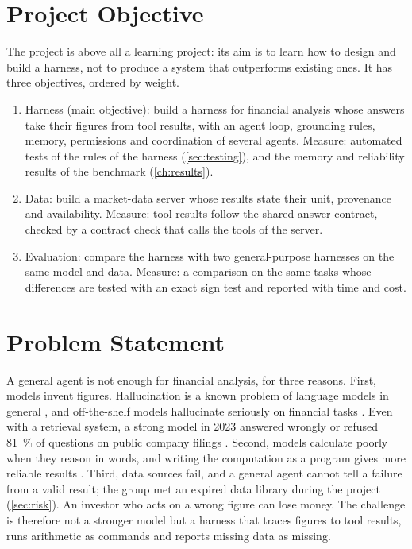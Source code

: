 \section{Project Objective}\label{sec:objective}
The project is above all a learning project: its aim is to learn how to design and build a harness, not to produce a system that outperforms existing ones.
It has three objectives, ordered by weight.
\begin{enumerate}
  \item Harness (main objective): build a harness for financial analysis whose answers take their figures from tool results, with an agent loop, grounding rules, memory, permissions and coordination of several agents.
  Measure: automated tests of the rules of the harness (\cref{sec:testing}), and the memory and reliability results of the benchmark (\cref{ch:results}).
  \item Data: build a market-data server whose results state their unit, provenance and availability.
  Measure: tool results follow the shared answer contract, checked by a contract check that calls the tools of the server.
  \item Evaluation: compare the harness with two general-purpose harnesses on the same model and data.
  Measure: a comparison on the same tasks whose differences are tested with an exact sign test and reported with time and cost.
\end{enumerate}

\section{Problem Statement}\label{sec:problem}
A general agent is not enough for financial analysis, for three reasons.
First, models invent figures.
Hallucination is a known problem of language models in general \parencite{huang2025hallucination}, and off-the-shelf models hallucinate seriously on financial tasks \parencite{kang2023deficiency}.
Even with a retrieval system, a strong model in 2023 answered wrongly or refused \qty{81}{\percent} of questions on public company filings \parencite{islam2023financebench}.
Second, models calculate poorly when they reason in words, and writing the computation as a program gives more reliable results \parencite{chen2023program}.
Third, data sources fail, and a general agent cannot tell a failure from a valid result; the group met an expired data library during the project (\cref{sec:risk}).
An investor who acts on a wrong figure can lose money.
The challenge is therefore not a stronger model but a harness that traces figures to tool results, runs arithmetic as commands and reports missing data as missing.


